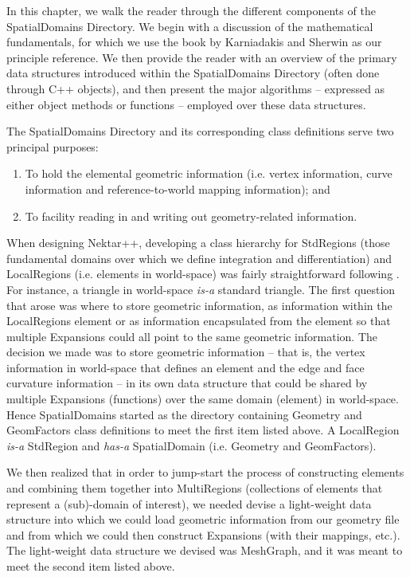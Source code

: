 In this chapter, we walk the reader through the different components
of the SpatialDomains Directory.  We begin with a discussion of the
mathematical fundamentals, for which we use the book by Karniadakis
and Sherwin \cite{KaSh05} as our principle reference.  We then provide
the reader with an overview of the primary data structures introduced
within the SpatialDomains Directory (often done through C++ objects),
and then present the major algorithms -- expressed as either object
methods or functions -- employed over these data structures.


The SpatialDomains Directory and its corresponding class definitions serve two principal purposes:
\begin{enumerate}
\item To hold the elemental geometric information (i.e. vertex information, curve information and reference-to-world mapping information); and
\item To facility reading in and writing out geometry-related information.
\end{enumerate}

When designing Nektar++, developing a class hierarchy for StdRegions
(those fundamental domains over which we define integration and
differentiation) and LocalRegions (i.e. elements in world-space) was
fairly straightforward following \cite{KaSh05}.  For instance, a
triangle in world-space {\em is-a} standard triangle.  The first
question that arose was where to store geometric information, as
information within the LocalRegions element or as information
encapsulated from the element so that multiple Expansions could all
point to the same geometric information.  The decision we made was to
store geometric information -- that is, the vertex information in
world-space that defines an element and the edge and face curvature
information -- in its own data structure that could be shared by
multiple Expansions (functions) over the same domain (element) in
world-space.  Hence SpatialDomains started as the directory containing
Geometry and GeomFactors class definitions to meet the first item
listed above.  A LocalRegion {\em is-a} StdRegion and {\em has-a}
SpatialDomain (i.e. Geometry and GeomFactors).

We then realized that in order to jump-start the process of
constructing elements and combining them together into MultiRegions
(collections of elements that represent a (sub)-domain of interest),
we needed devise a light-weight data structure into which we could
load geometric information from our geometry file and from which we
could then construct Expansions (with their mappings, etc.).  The
light-weight data structure we devised was MeshGraph, and it was meant
to meet the second item listed above.


